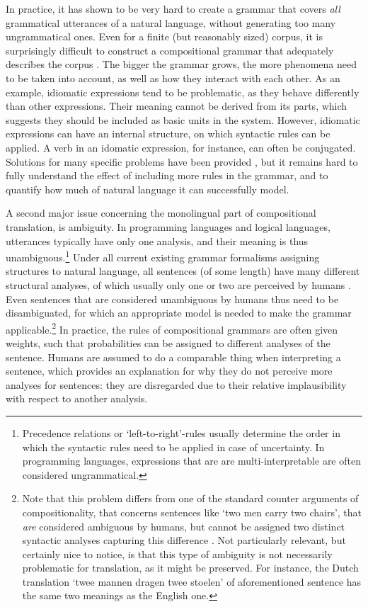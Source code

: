 In practice, it has shown to be very hard to create a grammar that covers \textit{all} grammatical utterances of a natural language, without generating too many ungrammatical ones.  Even for a finite (but reasonably sized) corpus, it is surprisingly difficult to construct a compositional grammar that adequately describes the corpus \citep{scha1990taaltheorie}. The bigger the grammar grows, the more phenomena need to be taken into account, as well as how they interact with each other. As an example, idiomatic expressions tend to be problematic, as they behave differently than other expressions. Their meaning cannot be derived from its parts, which suggests they should be included as basic units in the system. However, idiomatic expressions can have an internal structure, on which syntactic rules can be applied. A verb in an idomatic expression, for instance, can often be conjugated. Solutions for many specific problems have been provided \citep[in e.g.,][]{janssen1996compositionality}, but it remains hard to fully understand the effect of including more rules in the grammar, and to quantify how much of natural language it can successfully model.

A second major issue concerning the monolingual part of compositional translation, is ambiguity. In programming languages and logical languages, utterances typically have only one analysis, and their meaning is thus unambiguous.\footnote{Precedence relations or `left-to-right'-rules usually determine the order in which the syntactic rules need to be applied in case of uncertainty. In programming languages, expressions that are are multi-interpretable are often considered ungrammatical.} Under all current existing grammar formalisms assigning structures to natural language, all sentences (of some length) have many different structural analyses, of which usually only one or two are perceived by humans \citep{scha1990taaltheorie}. Even sentences that are considered unambiguous by humans thus need to be disambiguated, for which an appropriate model is needed to make the grammar applicable.\footnote{Note that this problem differs from one of the standard counter arguments of compositionality, that concerns sentences like `two men carry two chairs', that \textit{are} considered ambiguous by humans, but cannot be assigned two distinct syntactic analyses capturing this difference \citep{pelletier1994principle}. Not particularly relevant, but certainly nice to notice, is that this type of ambiguity is not necessarily problematic for translation, as it might be preserved. For instance, the Dutch translation `twee mannen dragen twee stoelen' of aforementioned sentence has the same two meanings as the English one.}  In practice, the rules of compositional grammars are often given weights, such that probabilities can be assigned to different analyses of the sentence. Humans are assumed to do a comparable thing when interpreting a sentence, which provides an explanation for why they do not perceive more analyses for sentences: they are disregarded due to their relative implausibility with respect to another analysis.

